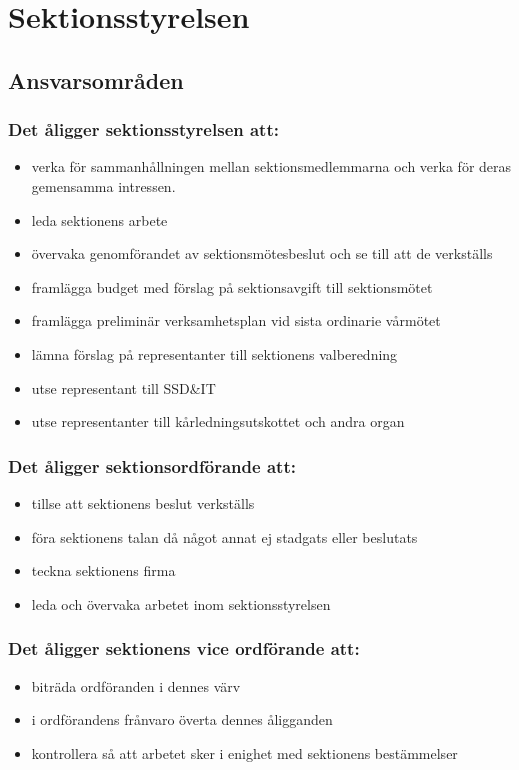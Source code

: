 \section{Sektionsstyrelsen}
\subsection{Ansvarsområden}
\subsubsection{Det åligger sektionsstyrelsen att:}
\begin{itemize}
  \item verka för sammanhållningen mellan sektionsmedlemmarna och verka för deras gemensamma intressen. 
  \item leda sektionens arbete 
  \item övervaka genomförandet av sektionsmötesbeslut och se till att de verkställs 
  \item framlägga budget med förslag på sektionsavgift till sektionsmötet 
  \item framlägga preliminär verksamhetsplan vid sista ordinarie vårmötet 
  \item lämna förslag på representanter till sektionens valberedning 
  \item utse representant till SSD\&IT 
  \item utse representanter till kårledningsutskottet och andra organ 
\end{itemize}
\subsubsection{Det åligger sektionsordförande att:} 
\begin{itemize}
  \item tillse att sektionens beslut verkställs 
  \item föra sektionens talan då något annat ej stadgats eller beslutats 
  \item teckna sektionens firma 
  \item leda och övervaka arbetet inom sektionsstyrelsen 
\end{itemize}
\subsubsection{Det åligger sektionens vice ordförande att:}
\begin{itemize}
  \item biträda ordföranden i dennes värv 
  \item i ordförandens frånvaro överta dennes åligganden 
  \item kontrollera så att arbetet sker i enighet med sektionens bestämmelser 
\end{itemize}
